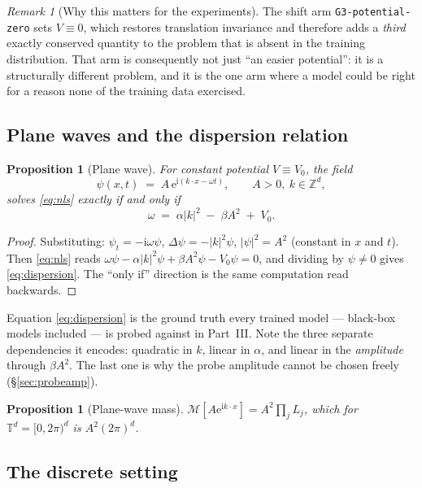 \documentclass[11pt,a4paper]{article}
\theoremstyle{plain}
\newtheorem{proposition}[theorem]{Proposition}
\theoremstyle{definition}
\theoremstyle{remark}
\newtheorem{remark}[theorem]{Remark}
\newcommand{\Z}{\mathbb{Z}}
\newcommand{\T}{\mathbb{T}}
\newcommand{\iu}{\mathrm{i}}
\newcommand{\eu}{\mathrm{e}}
\newcommand{\lap}{\Delta}
\newcommand{\Mass}{\mathcal{M}}
\newcommand{\code}[1]{\texttt{\small #1}}
\begin{document}
\begin{remark}[Why this matters for the experiments]
The shift arm \code{G3-potential-zero} sets $V\equiv 0$, which restores translation
invariance and therefore adds a \emph{third} exactly conserved quantity to the problem
that is absent in the training distribution. That arm is consequently not just ``an
easier potential'': it is a structurally different problem, and it is the one arm where a
model could be right for a reason none of the training data exercised.
\end{remark}

\subsection{Plane waves and the dispersion relation}

\begin{proposition}[Plane wave]
\label{prop:planewave}
For \emph{constant} potential $V\equiv V_0$, the field
\[
\psi(x,t) \;=\; A\,\eu^{\iu(k\cdot x - \omega t)},\qquad A>0,\ k\in\Z^d,
\]
solves \eqref{eq:nls} exactly if and only if
\begin{equation}
\label{eq:dispersion}
\omega \;=\; \alpha|k|^2 \;-\; \beta A^2 \;+\; V_0 .
\end{equation}
\end{proposition}

\begin{proof}
Substituting: $\psi_t = -\iu\omega\psi$, $\lap\psi = -|k|^2\psi$, $|\psi|^2 = A^2$
(constant in $x$ and $t$). Then \eqref{eq:nls} reads
$\omega\psi - \alpha|k|^2\psi + \beta A^2\psi - V_0\psi = 0$, and dividing by $\psi\neq0$
gives \eqref{eq:dispersion}. The ``only if'' direction is the same computation read
backwards.
\end{proof}

Equation \eqref{eq:dispersion} is the ground truth every trained model --- black-box
models included --- is probed against in Part~III. Note the three separate dependencies
it encodes: quadratic in $k$, linear in $\alpha$, and linear in the \emph{amplitude}
through $\beta A^2$. The last one is why the probe amplitude cannot be chosen freely
(\S\ref{sec:probeamp}).

\begin{proposition}[Plane-wave mass]
\label{prop:pwmass}
$\Mass[A\eu^{\iu k\cdot x}] = A^2\prod_j L_j$, which for $\T^d=[0,2\pi)^d$ is
$A^2(2\pi)^d$.
\end{proposition}

\subsection{The discrete setting}
\label{sec:discrete}
\end{document}
